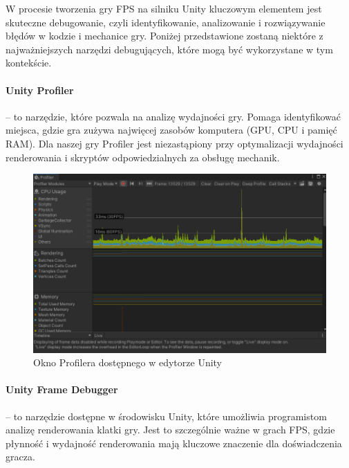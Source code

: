 W procesie tworzenia gry FPS na silniku Unity kluczowym elementem jest skuteczne debugowanie, czyli identyfikowanie, analizowanie i rozwiązywanie błędów w kodzie i mechanice gry. Poniżej przedstawione zostaną niektóre z najważniejszych narzędzi debugujących, które mogą być wykorzystane w tym kontekście.

\paragraph{Unity Profiler}\hspace{-1em} -- to narzędzie, które pozwala na analizę wydajności gry. Pomaga identyfikować miejsca, gdzie gra zużywa najwięcej zasobów komputera (GPU, CPU i pamięć RAM). Dla naszej gry Profiler jest niezastąpiony przy optymalizacji wydajności renderowania i skryptów odpowiedzialnych za obsługę mechanik.

\begin{figure}[h]
        \centering
        \includegraphics[width=0.9\linewidth]{Images/profiler}
        \caption{Okno Profilera dostępnego w edytorze Unity}
\end{figure}
\FloatBarrier
\paragraph{Unity Frame Debugger}\hspace{-1em} -- to narzędzie dostępne w środowisku Unity, które umożliwia programistom analizę renderowania klatki gry. Jest to szczególnie ważne w grach FPS, gdzie płynność i wydajność renderowania mają kluczowe znaczenie dla doświadczenia gracza.

